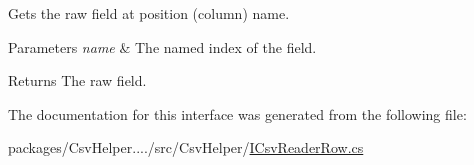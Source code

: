 Gets the raw field at position (column) name. 


\begin{DoxyParams}{Parameters}
{\em name} & The named index of the field.\\
\hline
\end{DoxyParams}
\begin{DoxyReturn}{Returns}
The raw field.
\end{DoxyReturn}


The documentation for this interface was generated from the following file\-:\begin{DoxyCompactItemize}
\item 
packages/\-Csv\-Helper..../src/\-Csv\-Helper/\hyperlink{a00212}{I\-Csv\-Reader\-Row.\-cs}\end{DoxyCompactItemize}
